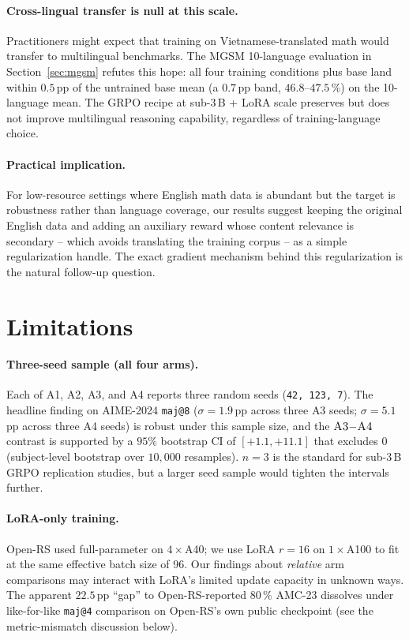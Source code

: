 \documentclass[11pt]{article}
\newcommand{\armA}{\textsc{A1}}
\newcommand{\armB}{\textsc{A2}}
\newcommand{\armC}{\textsc{A3}}
\newcommand{\armD}{\textsc{A4}}
\begin{document}
\paragraph{Cross-lingual transfer is null at this scale.}
Practitioners might expect that training on Vietnamese-translated math
would transfer to multilingual benchmarks. The MGSM 10-language
evaluation in Section~\ref{sec:mgsm} refutes this hope: all four
training conditions plus base land within $0.5$\,pp of the untrained
base mean (a $0.7$\,pp band, $46.8$--$47.5$\,\%) on the 10-language mean. The GRPO recipe at sub-3\,B + LoRA
scale preserves but does not improve multilingual reasoning
capability, regardless of training-language choice.

\paragraph{Practical implication.}
For low-resource settings where English math data is abundant but the
target is robustness rather than language coverage, our results suggest
keeping the original English data and adding an auxiliary reward whose
content relevance is secondary -- which avoids translating the
training corpus -- as a simple regularization handle. The exact
gradient mechanism behind this regularization is the natural follow-up
question.

\section{Limitations}
\label{sec:limitations}

\paragraph{Three-seed sample (all four arms).}
Each of \armA{}, \armB{}, \armC{}, and \armD{} reports three random
seeds (\texttt{42, 123, 7}). The headline finding on AIME-2024
\texttt{maj@8} ($\sigma{=}1.9$\,pp across three \armC{} seeds;
$\sigma{=}5.1$\,pp across three \armD{} seeds) is robust under this
sample size, and the $\armC{}{-}\armD{}$ contrast is supported by a
$95\%$ bootstrap CI of $[+1.1, +11.1]$ that excludes $0$ (subject-level
bootstrap over $10{,}000$ resamples). $n{=}3$ is the standard for sub-3\,B GRPO replication studies, but a larger
seed sample would tighten the intervals further.

\paragraph{LoRA-only training.}
Open-RS used full-parameter on $4\times$A40; we use LoRA $r{=}16$ on
$1\times$A100 to fit at the same effective batch size of 96. Our
findings about \emph{relative} arm comparisons may interact with LoRA's
limited update capacity in unknown ways. The apparent $22.5$\,pp
``gap'' to Open-RS-reported $80$\,\% AMC-23 dissolves under
like-for-like \texttt{maj@4} comparison on Open-RS's own public
checkpoint (see the metric-mismatch discussion below).
\end{document}
